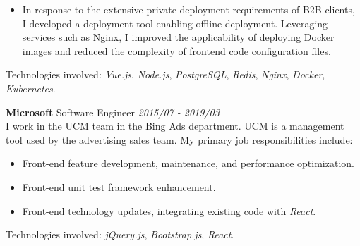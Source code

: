 \documentclass[a4paper]{article}
\newenvironment{changemargin}[2]{%
  \begin{list}{}{%
    \setlength{\topsep}{0pt}%
    \setlength{\leftmargin}{#1}%
    \setlength{\rightmargin}{#2}%
    \setlength{\listparindent}{\parindent}%
    \setlength{\itemindent}{\parindent}%
    \setlength{\parsep}{\parskip}%
  }%
  \item[]}{\end{list}
}
\newenvironment{body} {
	\vspace*{-16pt}
	\begin{changemargin}{-0.5in}{-0.5in}
  }
	{\end{changemargin}
}
\begin{document}
\begin{body}
	\vspace*{-8pt}
	\begin{itemize} \itemsep -0pt  %
		\item In response to the extensive private deployment requirements of B2B clients, I developed a deployment tool enabling offline deployment. Leveraging services such as Nginx, I improved the applicability of deploying Docker images and reduced the complexity of frontend code configuration files.\\
	\end{itemize}
	\vspace*{-8pt}

	\vspace{4pt}
	Technologies involved: \emph{Vue.js}, \emph{Node.js}, \emph{PostgreSQL}, \emph{Redis}, \emph{Nginx}, \emph{Docker}, \emph{Kubernetes}.
	\medskip

	\textbf{Microsoft} \hfill Software Engineer \emph{2015/07 - 2019/03} \\
	\smallskip
	I work in the UCM team in the Bing Ads department. UCM is a management tool used by the advertising sales team. My primary job responsibilities include:
	\begin{itemize} \itemsep -0pt  %
		\item Front-end feature development, maintenance, and performance optimization.\\
	\end{itemize}
	\vspace*{-8pt}
	\begin{itemize} \itemsep -0pt  %
		\item Front-end unit test framework enhancement.\\
	\end{itemize}
	\vspace*{-8pt}
	\begin{itemize} \itemsep -0pt  %
		\item Front-end technology updates, integrating existing code with \emph{React}.\\
	\end{itemize}
	Technologies involved: \emph{jQuery.js}, \emph{Bootstrap.js}, \emph{React}.\\

	\medskip
	

\end{body}
\end{document}
